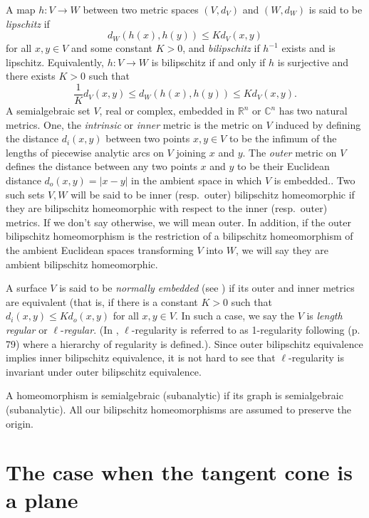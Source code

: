 \documentclass[article]{amsart}
\newcommand{\C}{\mathbb C}
\newcommand{\R}{\mathbb R}
\newcommand{\0}{{\bf 0}}
\begin{document}
A map $h: V \rightarrow W$ between two metric spaces $(V, d_V)$ and $(W, d_W)$ is said to be {\it lipschitz} if $$d_W(h(x), h(y)) \le Kd_V(x, y)$$ for all $x,y \in V$ and some constant $K>0$, and {\it bilipschitz} if $h^{-1}$ exists and is lipschitz.  Equivalently, $h: V\rightarrow W$ is bilipschitz if and only if $h$ is surjective and there exists $K> 0$ such that 
$$\frac{1}{K} d_V(x, y) \le d_W(h(x), h(y)) \le Kd_V(x, y).$$
A semialgebraic set $V$, real or complex, embedded in $\R^n$ or $\C^n$  has two natural metrics. One, the {\it intrinsic} or {\it inner} metric is the metric on $V$ induced by defining the distance 
$d_i(x,y)$ between two points $x, y \in V$ to be the 
infimum of the lengths of piecewise analytic arcs on $V$ joining $x$ and $y$.  The {\it outer} metric on $V$ defines the distance between any two points $x$ and $y$ to be their Euclidean distance $d_o(x,y)=|x-y|$ in the ambient space in which $V$ is embedded..  
Two such sets $V,W$ will be said to be inner (resp.\ outer) bilipschitz homeomorphic if they 
are bilipschitz homeomorphic with respect to the inner (resp.\ outer) metrics.  
If we don't say otherwise, we will mean outer.  In addition, if the outer bilipschitz 
homeomorphism is the restriction of a bilipschitz homeomorphism
 of the ambient Euclidean spaces 
 transforming $V$ into $W$, we will say they are ambient 
bilipschitz homeomorphic. 

A surface $V$  is said to be {\it normally embedded} (see \cite{BM}) if its outer and inner metrics are equivalent (that is, if there is a constant $K>0$ such that $d_i(x, y) \le Kd_o (x,y)$ for all $x,y\in V$.  In such a case, we say the $V$ is {\it length regular} or $\ell$-{\it regular}.  (In \cite{FW}, $\ell$-regularity is referred to as 1-regularity following \cite{T} (p. 79) where a hierarchy of regularity is defined.). Since outer bilipschitz equivalence implies inner bilipschitz equivalence, it is not hard to see that $\ell$-regularity is invariant under outer bilipschitz equivalence.
 

A homeomorphism is semialgebraic (subanalytic) if its graph is semialgebraic (subanalytic).
All our bilipschitz homeomorphisms are assumed to preserve the origin.


\section{The case when the tangent cone is a plane}
\end{document}
